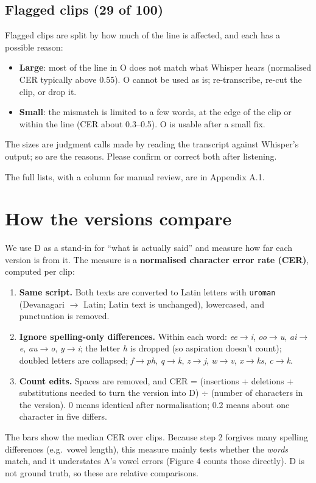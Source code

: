 \documentclass[11pt]{article}
\begin{document}
\subsection*{Flagged clips (29 of 100)}
Flagged clips are split by how much of the line is affected, and each has a possible reason:
\begin{itemize}
\item \textbf{Large}: most of the line in O does not match what Whisper hears (normalised CER typically above 0.55). O cannot be used as is; re-transcribe, re-cut the clip, or drop it.
\item \textbf{Small}: the mismatch is limited to a few words, at the edge of the clip or within the line (CER about 0.3--0.5). O is usable after a small fix.
\end{itemize}
The sizes are judgment calls made by reading the transcript against Whisper's output; so are the reasons. Please confirm or correct both after listening.

The full lists, with a column for manual review, are in Appendix A.1.

\section*{How the versions compare}
We use D as a stand-in for ``what is actually said'' and measure how far each version is from it. The measure is a \textbf{normalised character error rate (CER)}, computed per clip:
\begin{enumerate}
\item \textbf{Same script.} Both texts are converted to Latin letters with \texttt{uroman} (Devanagari $\rightarrow$ Latin; Latin text is unchanged), lowercased, and punctuation is removed.
\item \textbf{Ignore spelling-only differences.} Within each word: \emph{ee}$\rightarrow$\emph{i}, \emph{oo}$\rightarrow$\emph{u}, \emph{ai}$\rightarrow$\emph{e}, \emph{au}$\rightarrow$\emph{o}, \emph{y}$\rightarrow$\emph{i}; the letter \emph{h} is dropped (so aspiration doesn't count); doubled letters are collapsed; \emph{f}$\rightarrow$\emph{ph}, \emph{q}$\rightarrow$\emph{k}, \emph{z}$\rightarrow$\emph{j}, \emph{w}$\rightarrow$\emph{v}, \emph{x}$\rightarrow$\emph{ks}, \emph{c}$\rightarrow$\emph{k}.
\item \textbf{Count edits.} Spaces are removed, and CER = (insertions + deletions + substitutions needed to turn the version into D) $\div$ (number of characters in the version). 0 means identical after normalisation; 0.2 means about one character in five differs.
\end{enumerate}
The bars show the median CER over clips. Because step 2 forgives many spelling differences (e.g.\ vowel length), this measure mainly tests whether the \emph{words} match, and it understates A's vowel errors (Figure 4 counts those directly). D is not ground truth, so these are relative comparisons.
\end{document}
